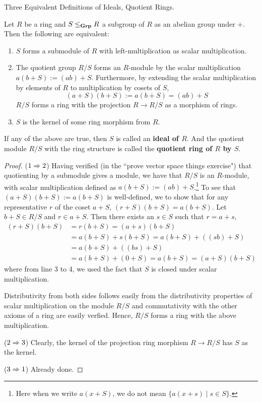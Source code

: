 \documentclass[../book.tex]{subfiles}
\begin{document}
\begin{dfn} Three Equivalent Definitions of Ideals, Quotient Rings. 

    Let $R$ be a ring and $S \leq_{\mathbf{Grp}} R$ a subgroup of $R$ as an abelian group
    under $+$. 
    Then the following are equivalent: 
    \begin{enumerate}
        \item $S$ forms a submodule of $R$ with 
        left-multiplication as scalar multiplication.
        \item The quotient group $R/S$ forms an $R$-module by
        the scalar multiplication $a(b + S) := (ab) + S$. 
        Furthermore, by extending the scalar multiplication by elements of $R$ to
        multiplication by cosets of $S$, 
        \[(a + S)(b + S) := a(b + S) = (ab) + S\]
        $R/S$ forms a ring with the projection $R \to R/S$ as a morphism of rings.
        \item $S$ is the kernel of some ring morphism from $R$. 
    \end{enumerate}
    If any of the above are true, then $S$ is called an \textbf{ideal of $R$}. 
    And the quotient module $R/S$ with the ring structure is called 
    the \textbf{quotient ring of $R$ by $S$}. 
\end{dfn}
\begin{proof}
    ($1 \Rightarrow 2$)
        Having verified (in the ``prove vector space things exercise") 
        that quotienting by a submodule gives a module,
        we have that $R/S$ is an $R$-module,
        with scalar multiplication defined as $a (b + S) := (ab) + S$.\footnote{
        Here when we write $a (x +S)$, 
        we do not mean $\{a(x+s) \mid s \in S\}$.}
        To see that $(a + S)(b + S) := a(b + S)$ is well-defined, 
        we to show that for any representative $r$ of the coset $a + S$, 
        $(r + S)(b + S) = a(b + S)$.
        Let $b + S \in R/S$ and  $r \in a + S$.
        Then there exists an $s \in S$ such that $r = a + s$,
        \begin{align*}
            (r + S)(b + S) &= r(b + S) = (a + s)(b + S) \\
            &= a (b + S) + s (b + S) = a(b + S) + ((sb) + S) \\
            &= a(b + S) + ((bs) + S) \\
            &= a(b + S) + (0 + S) = a(b + S) = (a + S)(b + S)
        \end{align*}
        where from line 3 to 4, we used the fact that 
        $S$ is closed under scalar multiplication. 
        
        Distributivity from both sides follows easily from
        the distributivity properties of scalar multiplication on the module $R/S$
        and commutativity with the other axioms of a ring are easily verfied.
        Hence, $R/S$ forms a ring with the above multiplication. 
        
    ($2 \Rightarrow 3$)
        Clearly, the kernel of the projection ring morphism $R \to R/S$
        has $S$ as the kernel. 
        
    ($3 \Rightarrow 1$)
        Already done.
\end{proof}
\end{document}

